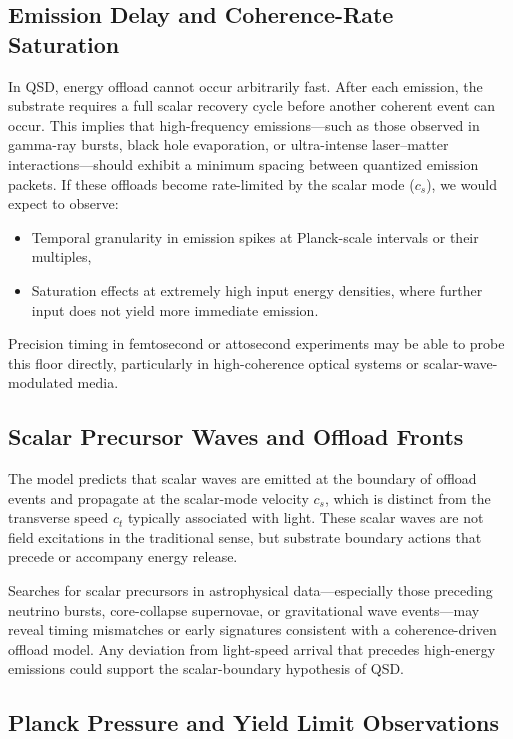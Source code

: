 \documentclass[ht-mathphys]{ht-fmt}
\theoremstyle{thmstyleone}%
\theoremstyle{thmstyletwo}%
\theoremstyle{thmstylethree}%
\begin{document}
\subsection{Emission Delay and Coherence-Rate Saturation}

In QSD, energy offload cannot occur arbitrarily fast. After each emission, the substrate requires a full scalar recovery cycle before another coherent event can occur. This implies that high-frequency emissions—such as those observed in gamma-ray bursts, black hole evaporation, or ultra-intense laser–matter interactions—should exhibit a minimum spacing between quantized emission packets. If these offloads become rate-limited by the scalar mode ($c_s$), we would expect to observe:

\begin{itemize}
    \item Temporal granularity in emission spikes at Planck-scale intervals or their multiples,
    \item Saturation effects at extremely high input energy densities, where further input does not yield more immediate emission.
\end{itemize}

Precision timing in femtosecond or attosecond experiments may be able to probe this floor directly, particularly in high-coherence optical systems or scalar-wave-modulated media.

\subsection{Scalar Precursor Waves and Offload Fronts}

The model predicts that scalar waves are emitted at the boundary of offload events and propagate at the scalar-mode velocity $c_s$, which is distinct from the transverse speed $c_t$ typically associated with light. These scalar waves are not field excitations in the traditional sense, but substrate boundary actions that precede or accompany energy release.

Searches for scalar precursors in astrophysical data—especially those preceding neutrino bursts, core-collapse supernovae, or gravitational wave events—may reveal timing mismatches or early signatures consistent with a coherence-driven offload model. Any deviation from light-speed arrival that precedes high-energy emissions could support the scalar-boundary hypothesis of QSD.

\subsection{Planck Pressure and Yield Limit Observations}
\end{document}
